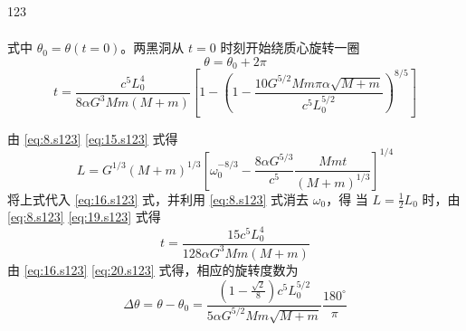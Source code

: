 \begin{solution}{123}
\begin{subsolution}
\begin{align}
            \label{eq:16.s123}
        \end{align}
        式中 $\theta_{0} = \theta(t = 0)$。两黑洞从 $t = 0$ 时刻开始绕质心旋转一圈
        \begin{equation}
            \theta = \theta_{0} + 2 \pi
            \label{eq:17.s123}
        \end{equation}
        \begin{equation}
            t = \frac{c^{5} L_{0}^{4}}{8 \alpha G^{3} M m (M + m)} \left[ 1 - \left(1 - \frac{10 G^{5/2} M m \pi \alpha \sqrt{M + m}}{c^{5} L_{0}^{5/2}}\right)^{8/5} \right]
            \label{eq:18.s123}
        \end{equation}
    \end{subsolution}
    \begin{subsolution}
        由 \eqref{eq:8.s123} \eqref{eq:15.s123} 式得
        \begin{equation}
            L = G^{1/3} (M + m)^{1/3} \left[ \omega_{0}^{-8/3} - \frac{8 \alpha G^{5/3}}{c^{5}} \frac{M m t}{(M + m)^{1/3}} \right]^{1/4}
            \label{eq:19.s123}
        \end{equation}
        将上式代入 \eqref{eq:16.s123} 式，并利用 \eqref{eq:8.s123} 式消去 $\omega_{0}$，得
        当 $L = \frac{1}{2} L_{0}$ 时，由 \eqref{eq:8.s123} \eqref{eq:19.s123} 式得
        \begin{equation}
            t = \frac{15 c^{5} L_{0}^{4}}{128 \alpha G^{3} M m (M + m)}
            \label{eq:20.s123}
        \end{equation}
        由 \eqref{eq:16.s123} \eqref{eq:20.s123} 式得，相应的旋转度数为
        \begin{equation}
            \Delta \theta = \theta - \theta_{0} = \frac{(1 - \frac{\sqrt{2}}{8}) c^{5} L_{0}^{5/2}}{5 \alpha G^{5/2} M m \sqrt{M + m}} \frac{180^{\circ}}{\pi}
            \label{eq:21.s123}
        \end{equation}
    \end{subsolution}
\end{solution}
